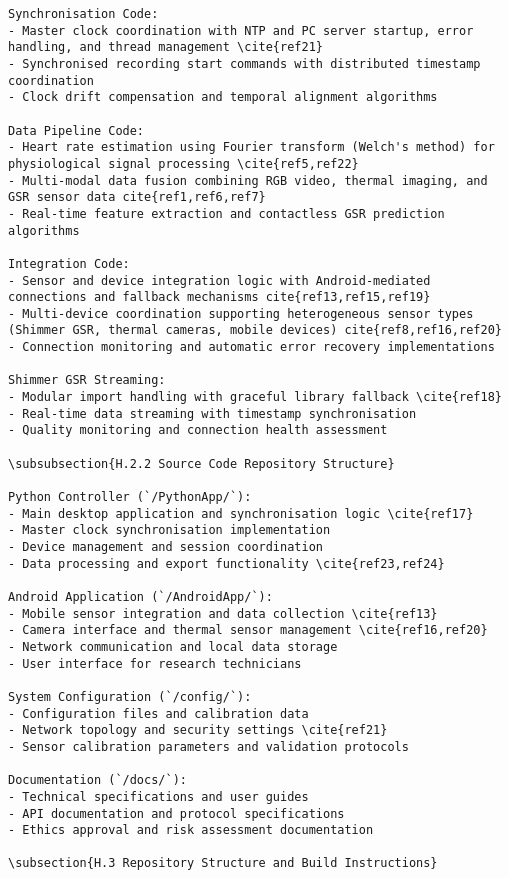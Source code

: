 \begin{verbatim}
Synchronisation Code:
- Master clock coordination with NTP and PC server startup, error handling, and thread management \cite{ref21}
- Synchronised recording start commands with distributed timestamp coordination
- Clock drift compensation and temporal alignment algorithms

Data Pipeline Code:
- Heart rate estimation using Fourier transform (Welch's method) for physiological signal processing \cite{ref5,ref22}
- Multi-modal data fusion combining RGB video, thermal imaging, and GSR sensor data cite{ref1,ref6,ref7}
- Real-time feature extraction and contactless GSR prediction algorithms

Integration Code:
- Sensor and device integration logic with Android-mediated connections and fallback mechanisms cite{ref13,ref15,ref19}
- Multi-device coordination supporting heterogeneous sensor types (Shimmer GSR, thermal cameras, mobile devices) cite{ref8,ref16,ref20}
- Connection monitoring and automatic error recovery implementations

Shimmer GSR Streaming:
- Modular import handling with graceful library fallback \cite{ref18}
- Real-time data streaming with timestamp synchronisation
- Quality monitoring and connection health assessment

\subsubsection{H.2.2 Source Code Repository Structure}

Python Controller (`/PythonApp/`):
- Main desktop application and synchronisation logic \cite{ref17}
- Master clock synchronisation implementation
- Device management and session coordination
- Data processing and export functionality \cite{ref23,ref24}

Android Application (`/AndroidApp/`):
- Mobile sensor integration and data collection \cite{ref13}
- Camera interface and thermal sensor management \cite{ref16,ref20}
- Network communication and local data storage
- User interface for research technicians

System Configuration (`/config/`):
- Configuration files and calibration data
- Network topology and security settings \cite{ref21}
- Sensor calibration parameters and validation protocols

Documentation (`/docs/`):
- Technical specifications and user guides
- API documentation and protocol specifications
- Ethics approval and risk assessment documentation

\subsection{H.3 Repository Structure and Build Instructions}


\end{verbatim}
